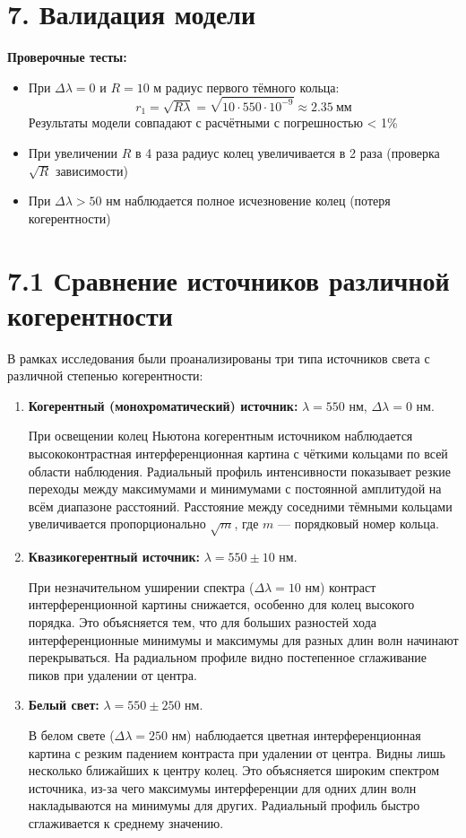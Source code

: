 \documentclass[10pt]{article}
\begin{document}
\section*{7. Валидация модели}

\textbf{Проверочные тесты:}
\begin{itemize}
    \item При $\Delta\lambda = 0$ и $R = 10$ м радиус первого тёмного кольца:
    $$ r_1 = \sqrt{R\lambda} = \sqrt{10 \cdot 550\cdot10^{-9}} \approx 2.35\ \text{мм} $$
    Результаты модели совпадают с расчётными с погрешностью < 1\%
    
    \item При увеличении $R$ в 4 раза радиус колец увеличивается в 2 раза (проверка $\sqrt{R}$ зависимости)
    
    \item При $\Delta\lambda > 50$ нм наблюдается полное исчезновение колец (потеря когерентности)
\end{itemize}

\section*{7.1 Сравнение источников различной когерентности}

В рамках исследования были проанализированы три типа источников света с различной степенью когерентности:

\begin{enumerate}
    \item \textbf{Когерентный (монохроматический) источник:} $\lambda = 550$ нм, $\Delta\lambda = 0$ нм.
    
    При освещении колец Ньютона когерентным источником наблюдается высококонтрастная интерференционная картина с чёткими кольцами по всей области наблюдения. Радиальный профиль интенсивности показывает резкие переходы между максимумами и минимумами с постоянной амплитудой на всём диапазоне расстояний. Расстояние между соседними тёмными кольцами увеличивается пропорционально $\sqrt{m}$, где $m$ — порядковый номер кольца.
    
    \item \textbf{Квазикогерентный источник:} $\lambda = 550 \pm 10$ нм.
    
    При незначительном уширении спектра ($\Delta\lambda = 10$ нм) контраст интерференционной картины снижается, особенно для колец высокого порядка. Это объясняется тем, что для больших разностей хода интерференционные минимумы и максимумы для разных длин волн начинают перекрываться. На радиальном профиле видно постепенное сглаживание пиков при удалении от центра.
    
    \item \textbf{Белый свет:} $\lambda = 550 \pm 250$ нм.
    
    В белом свете ($\Delta\lambda = 250$ нм) наблюдается цветная интерференционная картина с резким падением контраста при удалении от центра. Видны лишь несколько ближайших к центру колец. Это объясняется широким спектром источника, из-за чего максимумы интерференции для одних длин волн накладываются на минимумы для других. Радиальный профиль быстро сглаживается к среднему значению.
\end{enumerate}
\end{document}
